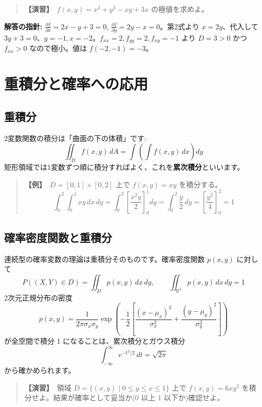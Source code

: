 \documentclass{article}
\begin{document}
\begin{quote}
\textbf{【演習】}\ \(f(x, y) = x^2 + y^2 - xy + 3x\) の極値を求めよ。
\end{quote}

\textbf{解答の指針:} \(\frac{\partial f}{\partial x} = 2x - y + 3 = 0\), \(\frac{\partial f}{\partial y} = 2y - x = 0\)。第2式より \(x = 2y\)、代入して \(3y + 3 = 0\)、\(y = -1, x = -2\)。\(f_{xx} = 2, f_{yy} = 2, f_{xy} = -1\) より \(D = 3 > 0\) かつ \(f_{xx} > 0\) なので極小。値は \(f(-2, -1) = -3\)。

\section{重積分と確率への応用}

\subsection{重積分}

2変数関数の積分は「曲面の下の体積」です:
\[ \iint_D f(x, y)\, dA = \int \left( \int f(x, y)\, dx \right) dy \]
矩形領域では1変数ずつ順に積分すればよく、これを\textbf{累次積分}といいます。

\begin{quote}
\textbf{【例】}\ \(D = [0, 1] \times [0, 2]\) 上で \(f(x, y) = xy\) を積分する。
\[ \int_0^2 \int_0^1 xy\, dx\, dy = \int_0^2 \left[ \frac{x^2 y}{2} \right]_0^1 dy = \int_0^2 \frac{y}{2}\, dy = \left[ \frac{y^2}{4} \right]_0^2 = 1 \]
\end{quote}

\subsection{確率密度関数と重積分}

連続型の確率変数の理論は重積分そのものです。確率密度関数 \(p(x, y)\) に対して
\[ P((X, Y) \in D) = \iint_D p(x, y)\, dx\, dy, \qquad \iint_{\mathbb{R}^2} p(x, y)\, dx\, dy = 1 \]
2次元正規分布の密度
\[ p(x, y) = \frac{1}{2\pi \sigma_x \sigma_y} \exp\left( -\frac{1}{2} \left[ \frac{(x - \mu_x)^2}{\sigma_x^2} + \frac{(y - \mu_y)^2}{\sigma_y^2} \right] \right) \]
が全空間で積分 1 になることは、累次積分とガウス積分
\[ \int_{-\infty}^{\infty} e^{-t^2/2}\, dt = \sqrt{2\pi} \]
から確かめられます。

\begin{quote}
\textbf{【演習】}\ 領域 \(D = \{(x, y) \mid 0 \le y \le x \le 1\}\) 上で \(f(x, y) = 6xy^2\) を積分せよ。結果が確率として妥当か(0 以上 1 以下か)確認せよ。
\end{quote}
\end{document}
